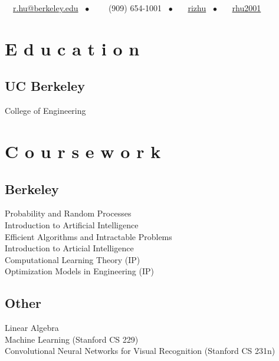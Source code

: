 \documentclass[]{deedy-resume-openfont}
\begin{document}
%
%
{\faEnvelope \ \ \href{mailto:r.hu@berkeley.edu}{r.hu@berkeley.edu} \ \(\bullet\) \ \ \faPhone \ \ (909)  654-1001 \ \(\bullet\) \ \faGithub \ \ \href{https://github.com/rizhu}{rizhu} \ \(\bullet\) \ \faLinkedin \ \ \href{https://www.linkedin.com/in/rhu2001/}{rhu2001}}

%
%

\begin{minipage}[t]{0.33\textwidth} 


\section{E d u c a t i o n} 

\subsection{UC Berkeley}
College of Engineering \\
\sectionsep


\section{C o u r s e w o r k}

\subsection{Berkeley}
Probability and Random Processes \\
Introduction to Artificial Intelligence \\
Efficient Algorithms and Intractable Problems \\
Introduction to Articial Intelligence \\
Computational Learning Theory (IP) \\
Optimization Models in Engineering (IP)
\subsection{Other}
Linear Algebra \\
Machine Learning (Stanford CS 229) \\
Convolutional Neural Networks for Visual Recognition (Stanford CS 231n) \\
\sectionsep


\end{minipage}
\end{document}
